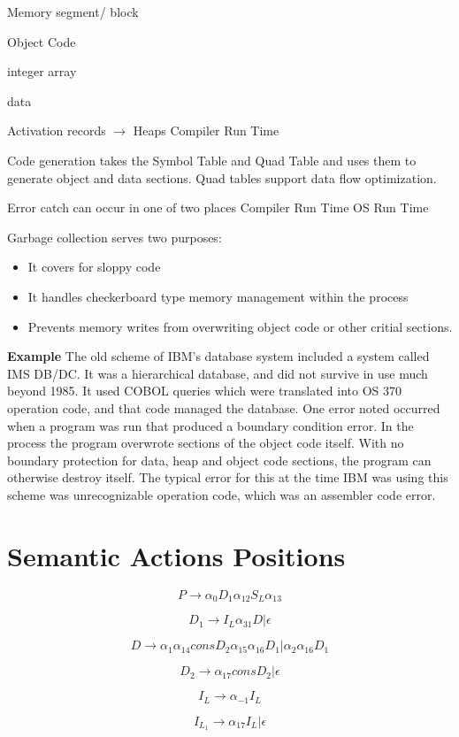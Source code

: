 \documentclass[11pt]{article}
\begin{document}
Memory segment/ block

Object Code

integer array

data

Activation records $\to$ Heaps
Compiler Run Time

Code generation takes the Symbol Table and Quad Table and uses them to generate object and data sections.   Quad tables support data flow optimization.  

Error catch can occur in one of two places 
Compiler Run Time 
OS Run Time 

Garbage collection serves two purposes:
\begin{itemize}
\item It covers for sloppy code
\item It handles checkerboard type memory management within the process
\item Prevents memory writes from overwriting object code or other critial sections.  
\end{itemize}

\textbf{Example}
The old scheme of IBM's database system included a system called IMS DB/DC.   It was a hierarchical database, and did not survive in use much beyond 1985.  It used COBOL queries which were translated into OS 370 operation code, and that code managed the database.  One error noted occurred when a program was run that produced a boundary condition error.  In the process the program overwrote sections of the object code itself.  With no boundary protection for data, heap and object code sections, the program can otherwise destroy itself.  The typical error for this at the time IBM was using this scheme was unrecognizable operation code, which was an assembler code error.  

\section {\Large Semantic Actions Positions}

\[ P\to \alpha_0 D_1 \alpha_{12} S_L \alpha_{13}\]

\[ D_1 \to I_L \alpha_{31} D | \epsilon \]

\[ D \to \alpha _1 \alpha_{14} cons D_2 \alpha_{15} \alpha_{16} D_1 | \alpha_2 \alpha_{16} D_1 \]

\[ D_2 \to \alpha_{17} cons D_2 |  \epsilon \]

\[ I_L \to \alpha _{-1} I_L \]

\[ I_{L_1} \to \alpha _{17} I_L  | \epsilon \]
\end{document}
